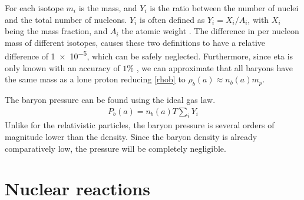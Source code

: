 For each isotope $m_i$ is the mass, and $Y_i$ is the ratio between the number of nuclei and the total number of nucleons. $Y_i$ is often defined as $Y_i=X_i/A_i$, with $X_i$ being the mass fraction, and $A_i$ the atomic weight \cite{Wagoner69}. The difference in per nucleon mass of different isotopes, causes these two definitions to have a relative difference of \num{1e-5}, which can be safely neglected. Furthermore, since eta is only known with an accuracy of $1\%$ \cite{Planck}, we can approximate that all baryons have the same mass as a lone proton reducing \eqref{rhob} to $\rho_b(a) \approx n_b(a)m_p$.

The baryon pressure can be found using the ideal gas law.
\begin{align}
    P_b(a)= n_b(a)T\sum_{i}^{}Y_i
\end{align}
Unlike for the relativistic particles, the baryon pressure is several orders of magnitude lower than the density. Since the baryon density is already comparatively low, the pressure will be completely negligible.




%
%
\section{Nuclear reactions}
\label{sec:nucleartheory}

